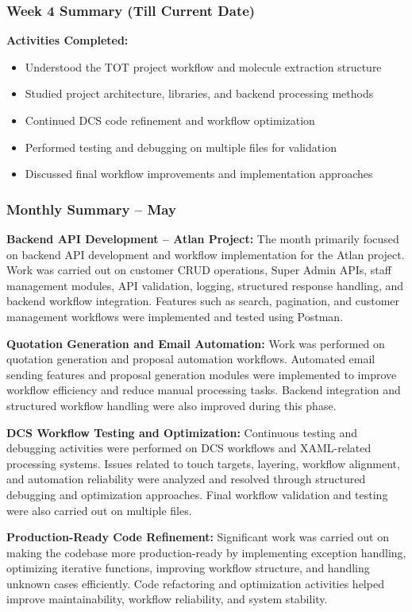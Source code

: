\documentclass[12pt,a4paper]{report}
\begin{document}
\subsubsection*{Week 4 Summary (Till Current Date)}
\textbf{Activities Completed:}
\begin{itemize}[leftmargin=1.5cm]
    \item Understood the TOT project workflow and molecule extraction structure
    \item Studied project architecture, libraries, and backend processing methods
    \item Continued DCS code refinement and workflow optimization
    \item Performed testing and debugging on multiple files for validation
    \item Discussed final workflow improvements and implementation approaches
\end{itemize}

\subsubsection*{Monthly Summary -- May}
\textbf{Backend API Development -- Atlan Project:}
The month primarily focused on backend API development and workflow implementation for the Atlan project. Work was carried out on customer CRUD operations, Super Admin APIs, staff management modules, API validation, logging, structured response handling, and backend workflow integration. Features such as search, pagination, and customer management workflows were implemented and tested using Postman.

\textbf{Quotation Generation and Email Automation:}
Work was performed on quotation generation and proposal automation workflows. Automated email sending features and proposal generation modules were implemented to improve workflow efficiency and reduce manual processing tasks. Backend integration and structured workflow handling were also improved during this phase.

\textbf{DCS Workflow Testing and Optimization:}
Continuous testing and debugging activities were performed on DCS workflows and XAML-related processing systems. Issues related to touch targets, layering, workflow alignment, and automation reliability were analyzed and resolved through structured debugging and optimization approaches. Final workflow validation and testing were also carried out on multiple files.

\textbf{Production-Ready Code Refinement:}
Significant work was carried out on making the codebase more production-ready by implementing exception handling, optimizing iterative functions, improving workflow structure, and handling unknown cases efficiently. Code refactoring and optimization activities helped improve maintainability, workflow reliability, and system stability.
\end{document}
